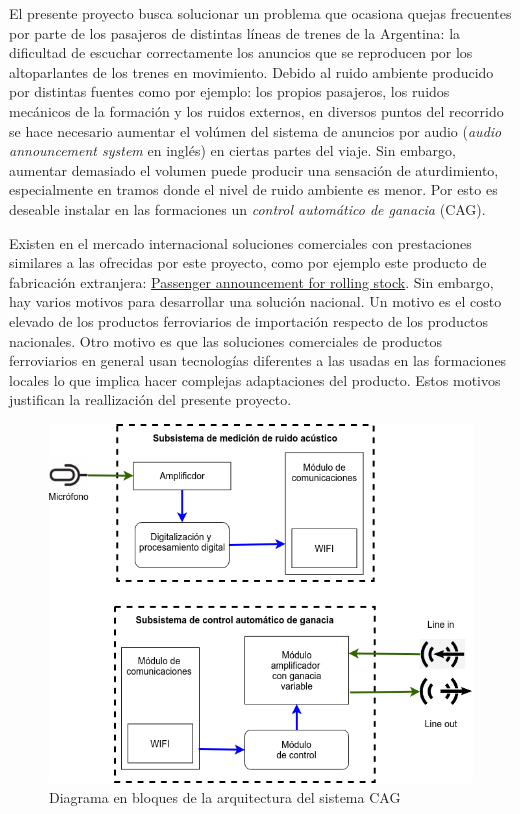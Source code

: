 \documentclass[11pt]{charter}
\begin{document}
El presente proyecto busca solucionar un problema que ocasiona quejas frecuentes por parte de los pasajeros de 
distintas líneas de trenes de la Argentina: la dificultad de escuchar correctamente los 
anuncios que se reproducen por los altoparlantes de los trenes en movimiento. Debido al ruido 
ambiente producido por distintas fuentes como por ejemplo: los propios pasajeros, los ruidos 
mecánicos de la formación y los ruidos externos, en diversos puntos del recorrido se hace necesario 
aumentar el volúmen del sistema de anuncios por audio ({\em audio announcement system \/} en inglés)
en ciertas partes del viaje. Sin embargo, aumentar demasiado el volumen puede producir una sensación 
de aturdimiento, especialmente en tramos donde el nivel de ruido ambiente es menor. Por esto es deseable 
instalar en las formaciones un {\em control automático de ganacia\/} (CAG). 

Existen en el mercado internacional soluciones comerciales con prestaciones similares a las ofrecidas por 
este proyecto, como por ejemplo este producto de fabricación extranjera: \href{http://www.ervocom.ch/en/module/solutions/10-digital-audio-solution-for-passenger-announcements}
{Passenger announcement for rolling stock}. Sin embargo, hay varios motivos para desarrollar una solución nacional. Un
motivo es el costo elevado de  los productos ferroviarios de importación respecto de los productos
nacionales. Otro motivo es que las soluciones comerciales de productos
ferroviarios en general usan tecnologías diferentes a las usadas en las formaciones locales lo que 
implica hacer complejas adaptaciones del producto. Estos motivos justifican  la reallización del presente proyecto. 

\vspace{25px}

\begin{figure}[htpb]
\centering 
\includegraphics[width=.7\textwidth]{./Figuras/arqCAG.png}
\caption{Diagrama en bloques de la arquitectura del sistema CAG }
\label{fig:diagBloques}
\end{figure}
\end{document}
